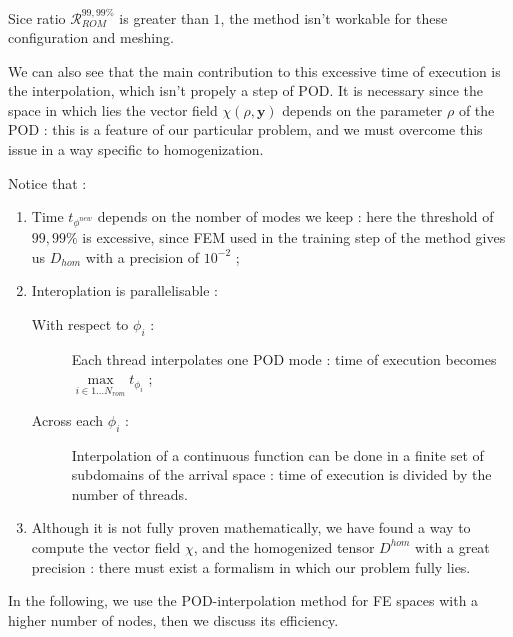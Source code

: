 \etoile
\newlength{\currentparskip}
\setlength{\currentparskip}{\parskip}
\begin{minipage}{\linewidth}
\setlength{\parskip}{\currentparskip}
Sice ratio $\mathcal{R}_{ROM}^{99,99\%}$ is greater than $1$, the method isn't workable for these configuration and meshing.

\par
We can also see that the main contribution to this excessive time of execution is the interpolation, which isn't propely a step of POD. %
It is necessary since the space in which lies the vector field $\chi(\rho,\mathbf{y})$ depends on the parameter $\rho$ of the POD : %
this is a feature of our particular problem, and we must overcome this issue in a way specific to homogenization.

\par
Notice that :

\begin{enumerate}[label=(interp \roman*)]
\item Time $t_{\phi^{new}}$ depends on the nomber of modes we keep : here the threshold of $99,99\%$ is excessive, since FEM used in the training step of the method gives us $D_{hom}$ with a precision of $10^{-2}$ ;
\item Interoplation is parallelisable :
\begin{description}
\item [With respect to $\phi_i$ :] Each thread interpolates one POD mode : time of execution becomes $\max\limits_{i\in 1\dots N_{rom}}t_{\phi_i}$ ;
\item [Across each $\phi_i$ :] Interpolation of a continuous function can be done in a finite set of subdomains of the arrival space : %
time of execution is divided by the number of threads.
\end{description}
\item Although it is not fully proven mathematically, we have found a way to compute the vector field $\chi$, and the homogenized tensor $D^{hom}$ with a great precision : %
there must exist a formalism in which our problem fully lies.
\end{enumerate}
\end{minipage}

\ligneinter
In the following, we use the POD-interpolation method for FE spaces with a higher number of nodes, %
then we discuss its efficiency.



